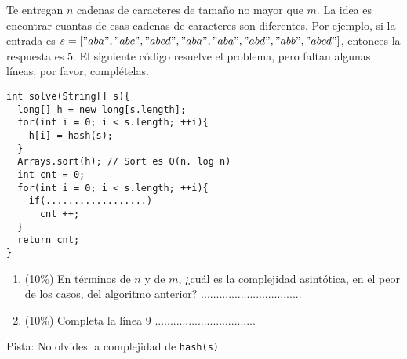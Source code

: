 \documentclass[10 pt]{article}
\begin{document}
\begin{multicols}{2}
Te entregan $n$ cadenas de caracteres de tamaño no mayor que $m$. La idea es encontrar cuantas de esas cadenas de caracteres son diferentes. Por ejemplo, si la entrada es $s = ["aba", "abc", "abcd", "aba", "aba", "abd", "abb", "abcd"]$, entonces la respuesta es $5$. El siguiente código resuelve el problema, pero faltan algunas líneas; por favor, complételas.

{\small
\begin{lstlisting}
int solve(String[] s){
  long[] h = new long[s.length];
  for(int i = 0; i < s.length; ++i){
    h[i] = hash(s); 
  }
  Arrays.sort(h); // Sort es O(n. log n)
  int cnt = 0;
  for(int i = 0; i < s.length; ++i){
    if(..................)
      cnt ++;
  }
  return cnt;
}
\end{lstlisting}
}
\begin{enumerate}[label=\Alph*]
	\item (10\%) En términos de $n$ y de $m$, ¿cuál es la complejidad asintótica, en el peor de los casos, del algoritmo anterior? .................................
	\item (10\%) Completa la línea 9 .................................
\end{enumerate}

Pista: No olvides la complejidad de \texttt{hash(s)}


\end{multicols}
\end{document}
